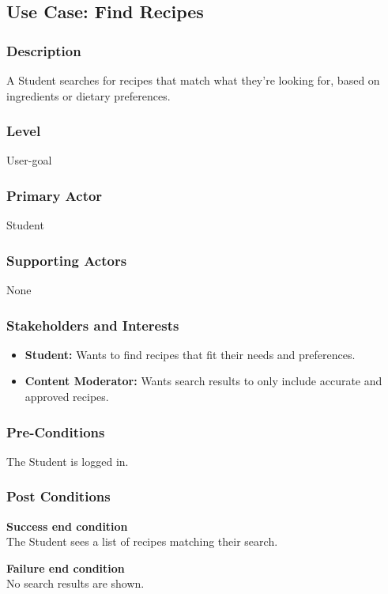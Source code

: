 \documentclass[10pt,letterpaper]{article}
\begin{document}
\subsection*{Use Case: Find Recipes}

\subsubsection*{Description}
A Student searches for recipes that match what they're looking for, based on ingredients or dietary preferences.

\subsubsection*{Level}
User-goal

\subsubsection*{Primary Actor}
Student

\subsubsection*{Supporting Actors}
None

\subsubsection*{Stakeholders and Interests}
\begin{itemize}
    \item \textbf{Student:} Wants to find recipes that fit their needs and preferences.
    \item \textbf{Content Moderator:} Wants search results to only include accurate and approved recipes.
\end{itemize}

\subsubsection*{Pre-Conditions}
The Student is logged in.

\subsubsection*{Post Conditions}

\textbf{Success end condition}\\
The Student sees a list of recipes matching their search.

\textbf{Failure end condition}\\
No search results are shown.
\end{document}
